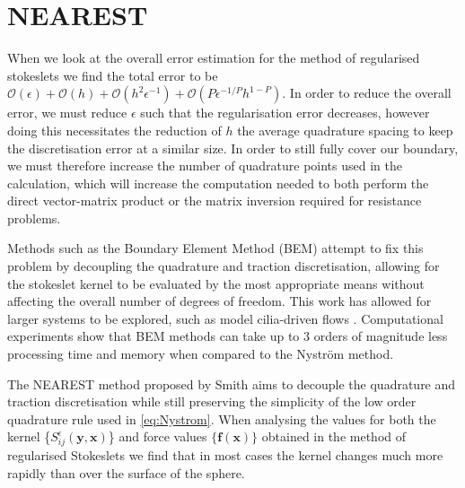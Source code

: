 \FloatBarrier
\section{NEAREST} \label{sec:NEAREST}
When we look at the overall error estimation for the method of regularised stokeslets we find the total error to be $\mathcal{O}(\epsilon) + \mathcal{O}(h) + \mathcal{O}(h^2\epsilon^{-1}) + \mathcal{O}(P\epsilon^{-1/P} h^{1-P})$. In order to reduce the overall error, we must reduce $\epsilon$ such that the regularisation error decreases, however doing this necessitates the reduction of $h$ the average quadrature spacing to keep the discretisation error at a similar size. In order to still fully cover our boundary, we must therefore increase the number of quadrature points used in the calculation, which will increase the computation needed to both perform the direct vector-matrix product or the matrix inversion required for resistance problems. 

Methods such as the Boundary Element Method (BEM) \cite{Smith2009AFlow} attempt to fix this problem by decoupling the quadrature and traction discretisation, allowing for the stokeslet kernel to be evaluated by the most appropriate means without affecting the overall number of degrees of freedom. This work has allowed for larger systems to be explored, such as model cilia-driven flows \cite{Sampaio2014Left-rightLaterality,Smith2012SymmetryEmbryo}. Computational experiments show that BEM methods can take up to 3 orders of magnitude less processing time and memory \cite{Smith2009AFlow} when compared to the Nyström method.

The NEAREST method proposed by Smith \cite{Smith2018AEquation} aims to decouple the quadrature and traction discretisation while still preserving the simplicity of the low order quadrature rule used in \cref{eq:Nystrom}. When analysing the values for both the kernel \{$S^\epsilon_{ij}(\bm{y},\bm{x})$\} and force values $\{\bm{f}(\bm{x})\}$ obtained in the method of regularised Stokeslets we find that in most cases the kernel changes much more rapidly than over the surface of the sphere. 

